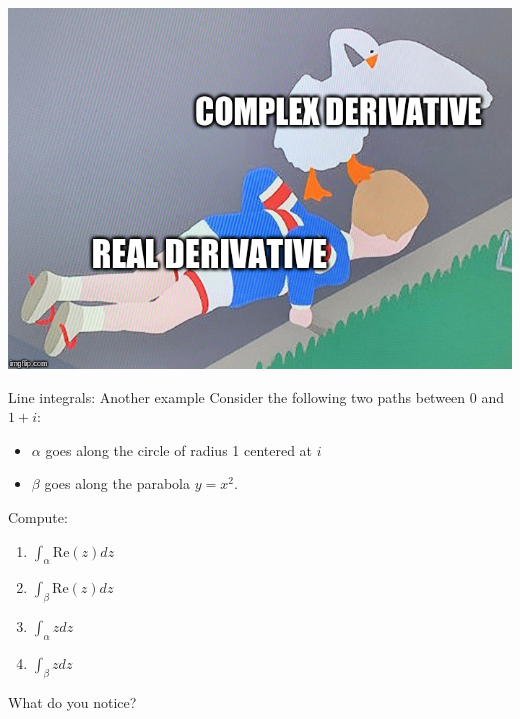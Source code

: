 \documentclass{beamer}
\begin{document}
\begin{frame}{}
\includegraphics[width=\textwidth,height=0.8\textheight,keepaspectratio]{GooseDerivative.jpg}
\end{frame}


\begin{frame}{Line integrals: Another example}
  Consider the following two paths between 0 and $1+i$:
\begin{itemize}
\item $\alpha$ goes  along the circle of radius 1 centered at $i$
\item $\beta$ goes along the parabola $y=x^2$.
\end{itemize}

Compute:
\begin{enumerate}
\item $\int_\alpha \text{Re}(z) dz$
\item  $\int_\beta \text{Re}(z)dz$
\item $\int_\alpha zdz$
\item $\int_\beta zdz$
\end{enumerate}

What do you notice?
\end{frame}
\end{document}
